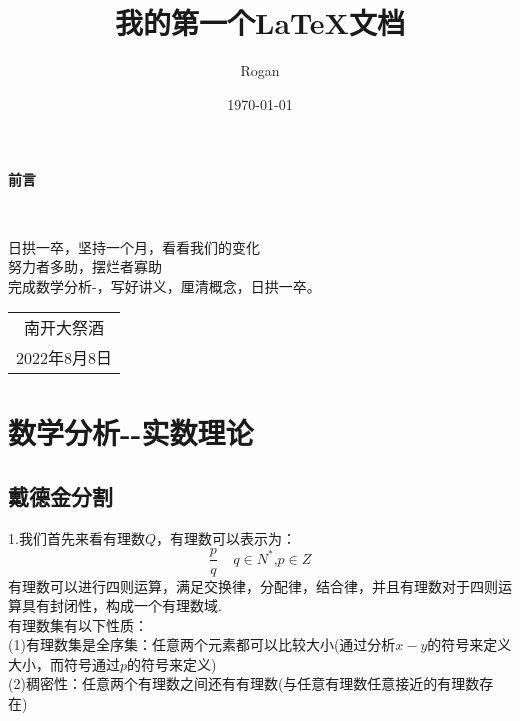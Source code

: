 \documentclass[12pt, a4paper, oneside]{ctexart}
\title{我的第一个\LaTeX 文档}
\author{Rogan}
\date{\today}
\begin{document}
\begin{center}
    \Huge\textbf{前言}
\end{center}~\

日拱一卒，坚持一个月，看看我们的变化\\

努力者多助，摆烂者寡助\\

完成数学分析-\uppercase\expandafter{}，写好讲义，厘清概念，日拱一卒。
~\\
\begin{flushright}
    \begin{tabular}{c}
        南开大祭酒\\
        2022年8月8日
    \end{tabular}
\end{flushright}

\newpage
{}
\setcounter{page}{1}
\tableofcontents
\newpage
\setcounter{page}{1}

\chapter{数学分析-\uppercase\expandafter{}-实数理论}

\section{戴德金分割}
1.我们首先来看有理数$Q$，有理数可以表示为：
\begin{equation*}
    \frac{p}{q}\;\;\;\;q\in N^{*}\mbox{,}p\in Z
\end{equation*}
有理数可以进行四则运算，满足交换律，分配律，结合律，并且有理数对于四则运算具有封闭性，构成一个有理数域.\\
有理数集有以下性质：\\
(1)有理数集是全序集：任意两个元素都可以比较大小(通过分析$x-y$的符号来定义大小，而符号通过$p$的符号来定义)\\
(2)稠密性：任意两个有理数之间还有有理数(与任意有理数任意接近的有理数存在)\\
\end{document}

